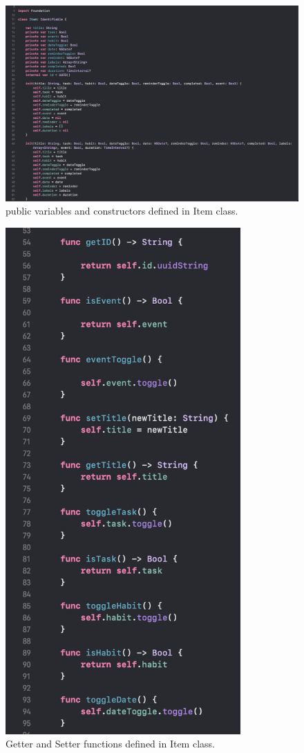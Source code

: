 \begin{figure}[H]
    \centering
    \includegraphics[width=\textwidth]{./graphics/Implementation/Dashboard/item1.png}
    \caption{public variables and constructors defined in Item class.}
    \label{fig:item1}
\end{figure}

\begin{figure}[H]
    \centering
    \includegraphics[width=9cm]{./graphics/Implementation/Dashboard/item2.png}
    \caption{Getter and Setter functions defined in Item class.}
    \label{fig:item2}
\end{figure}

